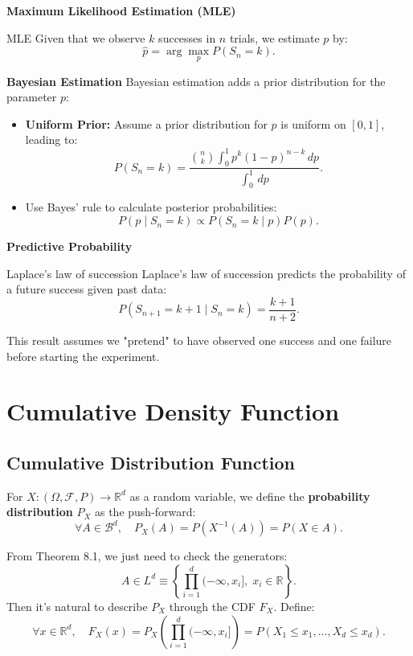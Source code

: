 \noindent\textbf{Maximum Likelihood Estimation (MLE)}
\begin{df}{MLE}
Given that we observe \(k\) successes in \(n\) trials, we estimate \(p\) by:
\[
\hat{p} = \arg\max_p P(S_n = k).
\]
\end{df}

\noindent\textbf{Bayesian Estimation}
Bayesian estimation adds a prior distribution for the parameter \(p\):
\begin{itemize}
    \item \textbf{Uniform Prior:} Assume a prior distribution for \(p\) is uniform on \([0, 1]\), leading to:
    \[
    P(S_n = k) = \frac{\binom{n}{k} \int_0^1 p^k (1-p)^{n-k} \, dp}{\int_0^1 \, dp}.
    \]
    \item Use Bayes' rule to calculate posterior probabilities:
    \[
    P(p \mid S_n = k) \propto P(S_n = k \mid p) P(p).
    \]
\end{itemize}

\noindent\textbf{Predictive Probability}
\begin{thm}{Laplace's law of succession}
Laplace's law of succession predicts the probability of a future success given past data:
\[
P(S_{n+1} = k+1 \mid S_n = k) = \frac{k+1}{n+2}.
\]
\end{thm}


\begin{rmk}
This result assumes we "pretend" to have observed one success and one failure before starting the experiment.
\end{rmk}


\newpage
\section{Cumulative Density Function}
\subsection{Cumulative Distribution Function}
For \( X: (\Omega, \mathscr{F}, P) \to \mathbb{R}^d \) as a random variable, we define the \textbf{probability distribution} \( P_X \) as the push-forward:
\[
\forall A \in \mathscr{B}^d, \quad P_X(A) = P(X^{-1}(A)) = P(X \in A).
\]

\noindent From Theorem 8.1, we just need to check the generators:
\[
A \in L^d \equiv \left\{ \prod_{i=1}^d (-\infty, x_i], \; x_i \in \mathbb{R} \right\}.
\]
Then it's natural to describe \( P_X \) through the CDF \( F_X \). Define:
\[
\forall x \in \mathbb{R}^d, \quad F_X(x) = P_X\left( \prod_{i=1}^d (-\infty, x_i] \right) = P(X_1 \leq x_1, \dots, X_d \leq x_d).
\]

